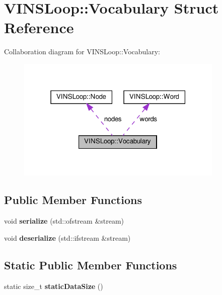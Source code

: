 \hypertarget{structVINSLoop_1_1Vocabulary}{}\section{V\+I\+N\+S\+Loop\+:\+:Vocabulary Struct Reference}
\label{structVINSLoop_1_1Vocabulary}


Collaboration diagram for V\+I\+N\+S\+Loop\+:\+:Vocabulary\+:\nopagebreak
\begin{figure}[H]
\begin{center}
\leavevmode
\includegraphics[width=280pt]{structVINSLoop_1_1Vocabulary__coll__graph}
\end{center}
\end{figure}
\subsection*{Public Member Functions}
\begin{DoxyCompactItemize}
\item 
\mbox{\label{structVINSLoop_1_1Vocabulary_af9f97fd8b1a582577c1ed5995b58a7e7}} 
void {\bfseries serialize} (std\+::ofstream \&stream)
\item 
\mbox{\label{structVINSLoop_1_1Vocabulary_a0e58c16cbcac2d36a6e1c305b81a09e8}} 
void {\bfseries deserialize} (std\+::ifstream \&stream)
\end{DoxyCompactItemize}
\subsection*{Static Public Member Functions}
\begin{DoxyCompactItemize}
\item 
\mbox{\label{structVINSLoop_1_1Vocabulary_a2d8c0576c84685f468bd8602fbe5175d}} 
static size\+\_\+t {\bfseries static\+Data\+Size} ()
\end{DoxyCompactItemize}
